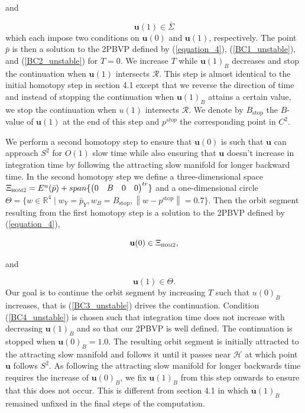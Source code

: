 \documentclass{ws-ijbc}
\begin{document}
\noindent
and 

\begin{equation}
\mathbf{u}(1) \in \bar{\Sigma}
\label{BC2_unstable}
\end{equation}
\noindent
which each impose two conditions on $\mathbf{u}(0)$ and $\mathbf{u}(1)$, respectively.  The point $\bar{p}$ is then a solution to the 2PBVP defined by (\ref{equation_4}), (\ref{BC1_unstable}), and (\ref{BC2_unstable}) for $T=0$.  We increase $T$ while $\mathbf{u}(1)_B$ decreases and stop the continuation when $\mathbf{u}(1)$ intersects $\mathscr{R}$.  This step is almost identical to the initial homotopy step in section 4.1 except that we reverse the direction of time and instead of stopping the continuation when $\mathbf{u}(1)_B$ attains a certain value, we stop the continuation when $u(1)$ intersects $\mathscr{R}$.  We denote by $B_{\mathrm{stop}}$ the $B$-value of $\mathbf{u}(1)$ at the end of this step and $p^{stop}$ the corresponding point in $C^2$.

We perform a second homotopy step to ensure that $\mathbf{u}(0)$ is such that $\mathbf{u}$ can approach $S^2$ for $O(1)$ slow time while also ensuring that $\mathbf{u}$ doesn't increase in integration time by following the attracting slow manifold for longer backward time.  In the second homotopy step we define a three-dimensional space $\Xi_{\textsc{hom2}} = E^u(\bar{p}) + span\{ \begin{pmatrix} 0 & B & 0 & 0 \end{pmatrix}^{tr} \}$ and a one-dimensional circle $\Theta = \{ w \in \mathbb{R}^4 \; | \; w_Y=\bar{p}_Y, w_B=B_{\mathrm{stop}}, \left\lVert w-p^{\mathrm{stop}} \right\lVert=0.7\}$.  Then the orbit segment resulting from the first homotopy step is a solution to the 2PBVP defined by (\ref{equation_4}),

\begin{equation}
\mathbf{u}(0) \in \Xi_{\textsc{hom2}},
\label{BC3_unstable}
\end{equation}

\noindent
and 

\begin{equation}
\mathbf{u}(1) \in \Theta.
\label{BC4_unstable}
\end{equation}
\noindent
Our goal is to continue the orbit segment by increasing $T$ such that $u(0)_B$ increases, that is (\ref{BC3_unstable}) drives the continuation.  Condition (\ref{BC4_unstable}) is chosen such that integration time does not increase with decreasing $\mathbf{u}(1)_B$ and so that our 2PBVP is well defined.  The continuation is stopped when $\mathbf{u}(0)_B =1.0$.  The resulting orbit segment is initially attracted to the attracting slow manifold and follows it until it passes near $\mathscr{H}$ at which point $\mathbf{u}$ follows $S^2$.  As following the attracting slow manifold for longer backwards time requires the increase of $\mathbf{u}(0)_B$, we fix $\mathbf{u}(1)_B$ from this step onwards to ensure that this does not occur.  This is different from section 4.1 in which $\mathbf{u}(1)_B$ remained unfixed in the final steps of the computation. 
\end{document}
